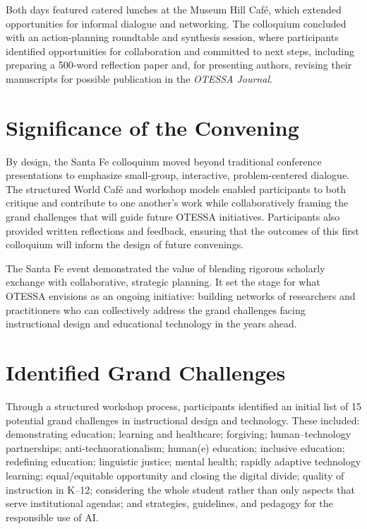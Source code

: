 \documentclass[
  letterpaper,
  DIV=11,
  numbers=noendperiod]{scrartcl}
\begin{document}
Both days featured catered lunches at the Museum Hill Café, which
extended opportunities for informal dialogue and networking. The
colloquium concluded with an action-planning roundtable and synthesis
session, where participants identified opportunities for collaboration
and committed to next steps, including preparing a 500-word reflection
paper and, for presenting authors, revising their manuscripts for
possible publication in the \emph{OTESSA Journal}.

\section{Significance of the
Convening}\label{significance-of-the-convening}

By design, the Santa Fe colloquium moved beyond traditional conference
presentations to emphasize small-group, interactive, problem-centered
dialogue. The structured World Café and workshop models enabled
participants to both critique and contribute to one another's work while
collaboratively framing the grand challenges that will guide future
OTESSA initiatives. Participants also provided written reflections and
feedback, ensuring that the outcomes of this first colloquium will
inform the design of future convenings.

The Santa Fe event demonstrated the value of blending rigorous scholarly
exchange with collaborative, strategic planning. It set the stage for
what OTESSA envisions as an ongoing initiative: building networks of
researchers and practitioners who can collectively address the grand
challenges facing instructional design and educational technology in the
years ahead.

\section{Identified Grand Challenges}\label{identified-grand-challenges}

Through a structured workshop process, participants identified an
initial list of 15 potential grand challenges in instructional design
and technology. These included: demonstrating education; learning and
healthcare; forgiving; human--technology partnerships;
anti-technorationalism; human(e) education; inclusive education;
redefining education; linguistic justice; mental health; rapidly
adaptive technology learning; equal/equitable opportunity and closing
the digital divide; quality of instruction in K--12; considering the
whole student rather than only aspects that serve institutional agendas;
and strategies, guidelines, and pedagogy for the responsible use of AI.
\end{document}
